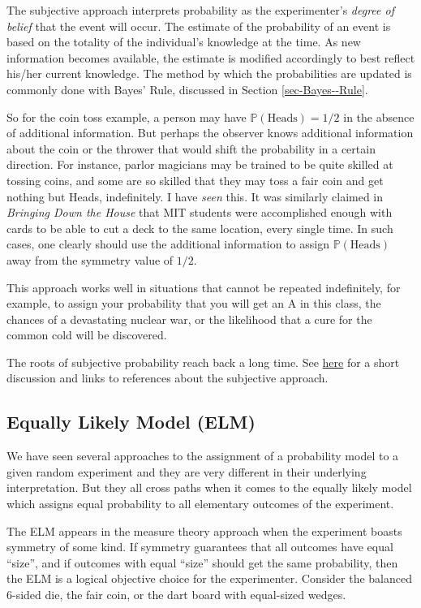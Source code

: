 \documentclass[captions=tableheading]{scrbook}
\begin{document}
The subjective approach interprets probability as the experimenter's \emph{degree of belief} that the event will occur. The estimate of the probability of an event is based on the totality of the individual's knowledge at the time. As new information becomes available, the estimate is modified accordingly to best reflect his/her current knowledge. The method by which the probabilities are updated is commonly done with Bayes' Rule, discussed in Section \ref{sec-Bayes--Rule}. 

So for the coin toss example, a person may have \(\mathbb{P}(\mbox{Heads})=1/2\) in the absence of additional information. But perhaps the observer knows additional information about the coin or the thrower that would shift the probability in a certain direction. For instance, parlor magicians may be trained to be quite skilled at tossing coins, and some are so skilled that they may toss a fair coin and get nothing but Heads, indefinitely. I have \emph{seen} this. It was similarly claimed in \emph{Bringing Down the House} \cite{Mezrich2003} that MIT students were accomplished enough with cards to be able to cut a deck to the same location, every single time. In such cases, one clearly should use the additional information to assign \(\mathbb{P}(\mbox{Heads})\) away from the symmetry value of \(1/2\).

This approach works well in situations that cannot be repeated indefinitely, for example, to assign your probability that you will get an A in this class, the chances of a devastating nuclear war, or the likelihood that a cure for the common cold will be discovered.

The roots of subjective probability reach back a long time. See \href{http://en.wikipedia.org/wiki/Subjective_probability}{here} for a short discussion and links to references about the subjective approach.
\subsection{Equally Likely Model (ELM)}
\label{sec-4-3-4}


We have seen several approaches to the assignment of a probability model to a given random experiment and they are very different in their underlying interpretation. But they all cross paths when it comes to the equally likely model which assigns equal probability to all elementary outcomes of the experiment.

The ELM appears in the measure theory approach when the experiment boasts symmetry of some kind. If symmetry guarantees that all outcomes have equal ``size'', and if outcomes with equal ``size'' should get the same probability, then the ELM is a logical objective choice for the experimenter. Consider the balanced 6-sided die, the fair coin, or the dart board with equal-sized wedges.
\end{document}
